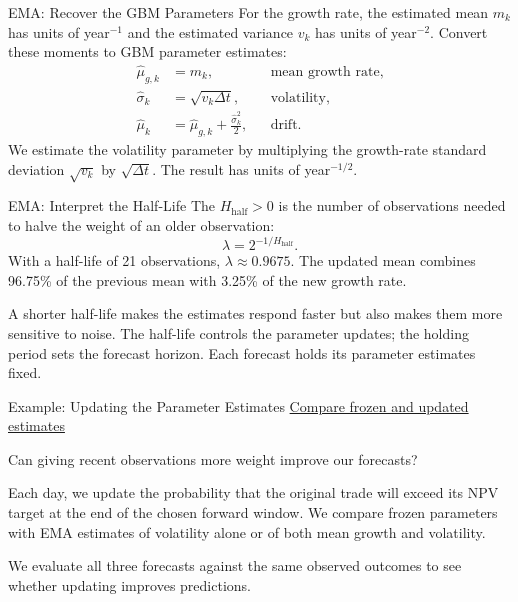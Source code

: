 \documentclass[aspectratio=169,11pt]{beamer}
\begin{document}
\begin{frame}{EMA: Recover the GBM Parameters}
For the growth rate, the estimated mean $m_k$ has units of year$^{-1}$ and
the estimated variance $v_k$ has units of year$^{-2}$. Convert these moments
to GBM parameter estimates:
\[
\begin{aligned}
  \hat\mu_{g,k} &= m_k,
    & &\text{mean growth rate},\\[0.4em]
  \hat\sigma_k &= \sqrt{v_k\Delta t},
    & &\text{volatility},\\[0.4em]
  \hat\mu_k &= \hat\mu_{g,k}+\frac{\hat\sigma_k^2}{2},
    & &\text{drift}.
\end{aligned}
\]
We estimate the volatility parameter by multiplying the growth-rate
standard deviation $\sqrt{v_k}$ by $\sqrt{\Delta t}$. The result has units
of year$^{-1/2}$.

\end{frame}

\begin{frame}{EMA: Interpret the Half-Life}
The  $H_{\mathrm{half}}>0$ is the number of observations
needed to halve the weight of an older observation:
\[
  \lambda=2^{-1/H_{\mathrm{half}}}.
\]
With a half-life of 21 observations, $\lambda\approx0.9675$. The updated
mean combines 96.75\% of the previous mean with 3.25\% of the new growth rate.

\vspace{0.7em}
A shorter half-life makes the estimates respond faster but also makes
them more sensitive to noise. The half-life controls the parameter updates; the holding period
sets the forecast horizon. Each forecast holds its parameter estimates fixed.

\end{frame}

\begin{frame}{Example: Updating the Parameter Estimates}
\textbf{}
\href{https://github.com/varnerlab/CHEME-5660-CourseRepository-Fall-2026/blob/main/lectures/week-5/L5a/CHEME-5660-L5a-Example-EMA-SAGBM-Fall-2026.ipynb}{Compare frozen and updated estimates}

\vspace{0.8em}
Can giving recent observations more weight improve our forecasts?

\vspace{0.7em}
Each day, we update the probability that the original trade will exceed
its NPV target at the end of the chosen forward window. We compare frozen
parameters with EMA estimates of volatility alone or of both mean growth
and volatility.

\vspace{0.7em}
We evaluate all three forecasts against the same observed outcomes to see
whether updating improves predictions.
\end{frame}
\end{document}
